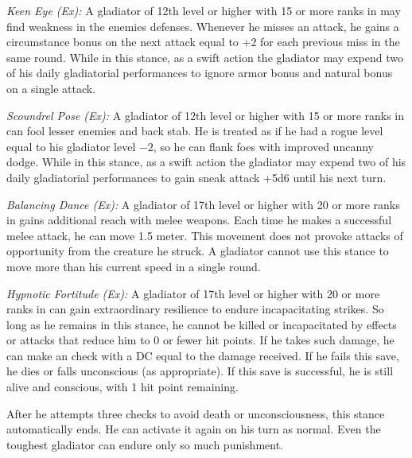 \textit{Keen Eye (Ex):} A gladiator of 12th level or higher with 15 or more ranks in  may find weakness in the enemies defenses. Whenever he misses an attack, he gains a circumstance bonus on the next attack equal to +2 for each previous miss in the same round. While in this stance, as a swift action the gladiator may expend two of his daily gladiatorial performances to ignore armor bonus and natural bonus on a single attack. 

\textit{Scoundrel Pose (Ex):} A gladiator of 12th level or higher with 15 or more ranks in  can fool lesser enemies and back stab. He is treated as if he had a rogue level equal to his gladiator level $-2$, so he can flank foes with improved uncanny dodge. While in this stance, as a swift action the gladiator may expend two of his daily gladiatorial performances to gain sneak attack +5d6 until his next turn.


\textit{Balancing Dance (Ex):} A gladiator of 17th level or higher with 20 or more ranks in  gains additional reach with melee weapons. Each time he makes a successful melee attack, he can move 1.5 meter. This movement does not provoke attacks of opportunity from the creature he struck. A gladiator cannot use this stance to move more than his current speed in a single round.

\textit{Hypnotic Fortitude (Ex):} A gladiator of 17th level or higher with 20 or more ranks in  can gain extraordinary resilience to endure incapacitating strikes. So long as he remains in this stance, he cannot be killed or incapacitated by effects or attacks that reduce him to 0 or fewer hit points. If he takes such damage, he can make an  check with a DC equal to the damage received. If he fails this save, he dies or falls unconscious (as appropriate). If this save is successful, he is still alive and conscious, with 1 hit point remaining.

After he attempts three  checks to avoid death or unconsciousness, this stance automatically ends. He can activate it again on his turn as normal. Even the toughest gladiator can endure only so much punishment.

